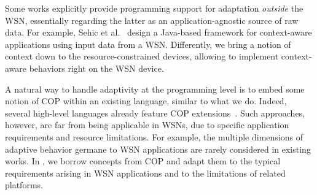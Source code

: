 
 Some works explicitly
provide programming support for adaptation \emph{outside} the WSN,
essentially regarding the latter as an application-agnostic source of
raw data. For example, Sehic et al.~\cite{Sehic11} design a Java-based
framework for context-aware applications using input data from a
WSN. Differently, we bring a notion of context down to the
resource-constrained devices, allowing to implement context-aware
behaviors right on the WSN device.

A natural way to handle adaptivity at the programming level is to
embed some notion of COP within an existing language, similar to what
we do. Indeed, several high-level languages already feature COP
extensions~\cite{Kamina11,Salvaneschi12,Sehic11}.  Such approaches,
however, are far from being applicable in WSNs, due to specific
application requirements and resource limitations. For example, the
multiple dimensions of adaptive behavior germane to WSN applications
are rarely considered in existing works. In \conesc, we borrow
concepts from COP and adapt them to the typical requirements arising
in WSN applications and to the limitations of related platforms.



